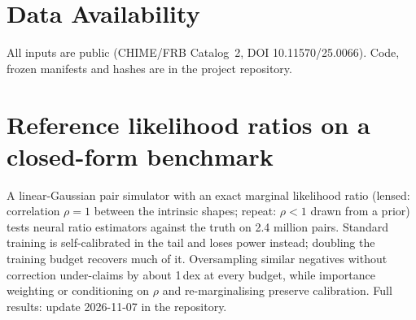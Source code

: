 \documentclass[fleqn,usenatbib]{mnras}
\begin{document}
\section*{Data Availability}
All inputs are public (CHIME/FRB Catalog~2, DOI 10.11570/25.0066). Code, frozen manifests and hashes are in the project repository.




\appendix
\section{Reference likelihood ratios on a closed-form benchmark}
\label{app:lr}
A linear-Gaussian pair simulator with an exact marginal likelihood ratio (lensed: correlation $\rho=1$ between the intrinsic
shapes; repeat: $\rho<1$ drawn from a prior) tests neural ratio estimators against the truth on 2.4 million pairs.
Standard training is self-calibrated in the tail and loses power instead; doubling the training budget recovers much of it.
Oversampling similar negatives without correction under-claims by about 1\,dex at every budget, while importance weighting
or conditioning on $\rho$ and re-marginalising preserve calibration. Full results: update 2026-11-07 in the repository.

\bsp
\label{lastpage}
\end{document}
